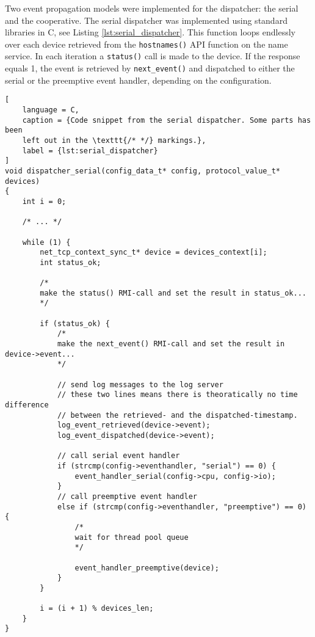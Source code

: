 Two event propagation models were implemented for the dispatcher: the serial
and the cooperative. The serial dispatcher was implemented using standard
libraries in C, see Listing \ref{lst:serial_dispatcher}. This function loops
endlessly over each device retrieved from the \texttt{hostnames()} API function
on the name service. In each iteration a \texttt{status()} call is made to the
device. If the response equals 1, the event is retrieved by
\texttt{next\_event()} and dispatched to either the serial or the preemptive
event handler, depending on the configuration.

\begin{lstlisting}[
    language = C,
    caption = {Code snippet from the serial dispatcher. Some parts has been
    left out in the \texttt{/* */} markings.},
    label = {lst:serial_dispatcher}
]
void dispatcher_serial(config_data_t* config, protocol_value_t* devices)
{
    int i = 0;

    /* ... */

    while (1) {
        net_tcp_context_sync_t* device = devices_context[i];
        int status_ok;

        /*
        make the status() RMI-call and set the result in status_ok...
        */

        if (status_ok) {
            /*
            make the next_event() RMI-call and set the result in device->event...
            */

            // send log messages to the log server
            // these two lines means there is theoratically no time difference
            // between the retrieved- and the dispatched-timestamp.
            log_event_retrieved(device->event);
            log_event_dispatched(device->event);

            // call serial event handler
            if (strcmp(config->eventhandler, "serial") == 0) {
                event_handler_serial(config->cpu, config->io);
            }
            // call preemptive event handler
            else if (strcmp(config->eventhandler, "preemptive") == 0) {
                /*
                wait for thread pool queue
                */

                event_handler_preemptive(device);
            }
        }

        i = (i + 1) % devices_len;
    }
}
\end{lstlisting}

